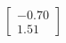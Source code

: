 \documentclass[preview]{standalone}
\begin{document}
\begin{align*}
\begin{bmatrix} -0.70 \\ 1.51 \end{bmatrix}
\end{align*}
\end{document}
